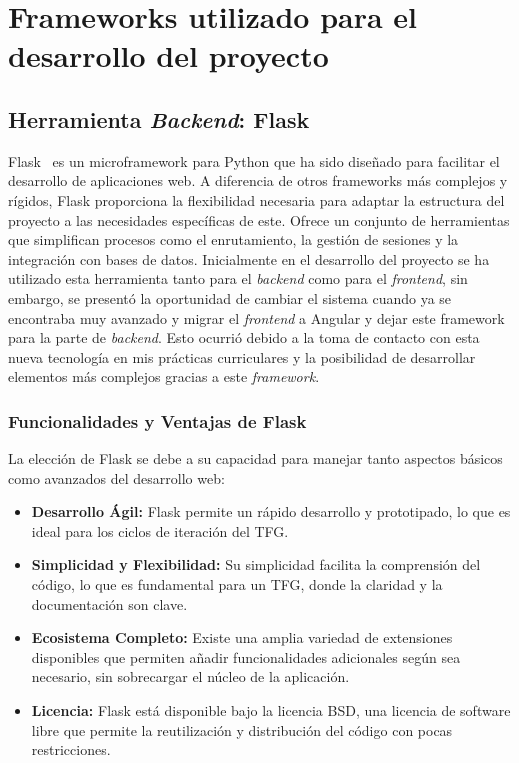 \section{Frameworks utilizado para el desarrollo del proyecto}

\subsection{Herramienta \textit{Backend}: Flask}

Flask~\cite{Flask} es un microframework para Python que ha sido diseñado para facilitar el desarrollo de aplicaciones web. A diferencia de otros frameworks más complejos y rígidos, Flask proporciona la flexibilidad necesaria para adaptar la estructura del proyecto a las necesidades específicas de este. Ofrece un conjunto de herramientas que simplifican procesos como el enrutamiento, la gestión de sesiones y la integración con bases de datos. Inicialmente en el desarrollo del proyecto se ha utilizado esta herramienta tanto para el \textit{backend} como para el \textit{frontend}, sin embargo, se presentó la oportunidad de cambiar el sistema cuando ya se encontraba muy avanzado y migrar el \textit{frontend} a Angular y dejar este framework para la parte de \textit{backend}. Esto ocurrió debido a la toma de contacto con esta nueva tecnología en mis prácticas curriculares y la posibilidad de desarrollar elementos más complejos gracias a este \textit{framework}.

\subsubsection{Funcionalidades y Ventajas de Flask}

La elección de Flask se debe a su capacidad para manejar tanto aspectos básicos como avanzados del desarrollo web:

\begin{itemize}
    \item \textbf{Desarrollo Ágil:} Flask permite un rápido desarrollo y prototipado, lo que es ideal para los ciclos de iteración del TFG.
    \item \textbf{Simplicidad y Flexibilidad:} Su simplicidad  facilita la comprensión del código, lo que es fundamental para un TFG, donde la claridad y la documentación son clave.
    \item \textbf{Ecosistema Completo:} Existe una amplia variedad de extensiones disponibles que permiten añadir funcionalidades adicionales según sea necesario, sin sobrecargar el núcleo de la aplicación.
    \item \textbf{Licencia:} Flask está disponible bajo la licencia BSD, una licencia de software libre que permite la reutilización y distribución del código con pocas restricciones.
\end{itemize}

